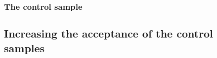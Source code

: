 \subsubsection{The \texorpdfstring{\gj}{photon plus jets} control sample}

\subsection{Increasing the acceptance of the control samples\label{sec:larger}}


